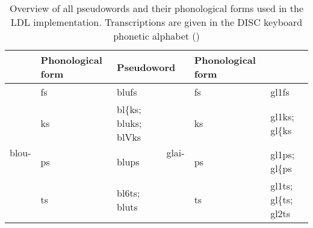 \begin{table}\fontsize{9}{10}
\caption{Overview of all pseudowords and their phonological forms used in the LDL implementation. Transcriptions are given in the DISC keyboard phonetic alphabet (\cite{Burnage1988})}
\label{tab:5.1}
\centering
\begin{tabular}{llllll} 
\lsptoprule
\multicolumn{2}{l}{Pseudoword}                                                          & Phonological form                                                                                     & \multicolumn{2}{l}{Pseudoword}                                                        & Phonological form                                                                                     \\ 
\midrule%
\multirow{4}{*}{blou-} & fs                                                             & blufs                                                                                                 & \multirow{4}{*}{glai-} & fs                                                           & gl1fs                                                                                                 \\
                       & ks                                                             & bl\{ks;
  bluks; blVks                                                                                &                        & ks                                                           & gl1ks;
  gl\{ks                                                                                       \\
                       & ps                                                             & blups                                                                                                 &                        & ps                                                           & gl1ps;
  gl\{ps                                                                                       \\
                       & ts                                                             & bl6ts;
  bluts                                                                                        &                        & ts                                                           & gl1ts;
  gl\{ts; gl2ts                                                                                \\ 
\midrule%

\end{tabular}
\end{table}
